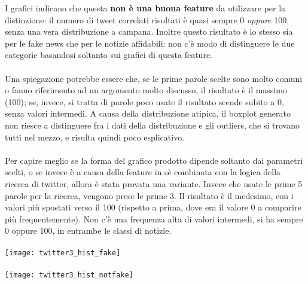 \documentclass{article}
\begin{document}
\begin{multicols}{2}
				I grafici indicano che questa \textbf{non è una buona feature} da utilizzare per la distinzione: il numero di tweet correlati risultati è quasi sempre 0 \textit{oppure} 100, senza una vera distribuzione a campana. Inoltre questo risultato è lo stesso sia per le fake news che per le notizie affidabili: non c'è modo di distinguere le due categorie basandosi soltanto sui grafici di questa feature.
				\\~\\
				Una spiegazione potrebbe essere che, se le prime parole scelte sono molto comuni o fanno riferimento ad un argomento molto discusso, il risultato è il massimo (100); se, invece, si tratta di parole poco usate il risultato scende subito a 0, senza valori intermedi.
				A causa della distribuzione atipica, il boxplot generato non riesce a distinguere fra i dati della distribuzione e gli outliers, che si trovano tutti nel mezzo, e risulta quindi poco esplicativo.
				\\~\\
				Per capire meglio se la forma del grafico prodotto dipende soltanto dai parametri scelti, o se invece è a causa della feature in sè combinata con la logica della ricerca di twitter, allora è stata provata una variante. Invece che usate le prime 5 parole per la ricerca, vengono prese le prime 3. Il risultato è il medesimo, con i valori più spostati verso il 100 (rispetto a prima, dove era il valore 0 a comparire più frequentemente). Non c'è una frequenza alta di valori intermedi, si ha sempre 0 oppure 100, in entrambe le classi di notizie.
				\\~\\
				\texttt{[image: twitter3\_hist\_fake]}
				\\~\\
				\texttt{[image: twitter3\_hist\_notfake]}
				

\end{multicols}
\end{document}
